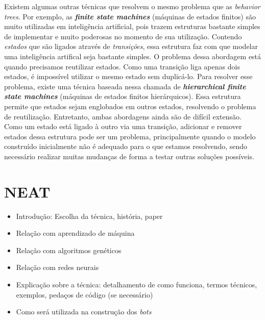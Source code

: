 Existem algumas outras técnicas que resolvem o mesmo problema que as
\textit{behavior trees}. Por exemplo, as \textbf{\textit{finite state machines}}
(máquinas de estados finitos) são muito utilizadas em inteligência artificial,
pois trazem estruturas bastante simples de implementar e muito poderosas no
momento de sua utilização. Contendo \textit{estados} que são ligados através de
\textit{transições}, essa estrutura faz com que modelar uma inteligência
artifical seja bastante simples. O problema dessa abordagem está quando
precisamos reutilizar estados. Como uma transição liga apenas dois estados, é
impossível utilizar o mesmo estado sem duplicá-lo. Para resolver esse problema,
existe uma técnica baseada nessa chamada de \textbf{\textit{hierarchical finite
state machines}} (máquinas de estados finitos hierárquicos). Essa estrutura
permite que estados sejam englobados em outros estados, resolvendo o problema de
reutilização.  Entretanto, ambas abordagens ainda são de difícil extensão. Como
um estado está ligado à outro via uma transição, adicionar e remover estados
dessa estrutura pode ser um problema, principalmente quando o modelo construído
inicialmente não é adequado para o que estamos resolvendo, sendo necessário
realizar muitas mudanças de forma a testar outras soluções possíveis.


\section{\label{section:neat}NEAT}
\begin{mdframed}[backgroundcolor=green!20]
\begin{itemize}
    \item
        Introdução: Escolha da técnica, história, paper
    \item
        Relação com aprendizado de máquina
    \item
        Relação com algoritmos genéticos
    \item
        Relação com redes neurais
    \item
        Explicação sobre a técnica: detalhamento de como funciona, termos
        técnicos, exemplos, pedaços de código (se necessário)
    \item
        Como será utilizada na construção dos \textit{bots}
\end{itemize}
\end{mdframed}
